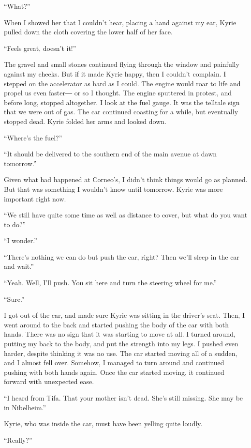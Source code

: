 \documentclass[oneside]{book}
\begin{document}
“What?”

When I showed her that I couldn’t hear, placing a hand against my ear, Kyrie pulled down the cloth covering the lower half of her face.

“Feels great, doesn’t it!”

The gravel and small stones continued flying through the window and painfully against my cheeks. But if it made Kyrie happy, then I couldn’t complain. I stepped on the accelerator as hard as I could. The engine would roar to life and propel us even faster― or so I thought. The engine sputtered in protest, and before long, stopped altogether. I look at the fuel gauge. It was the telltale sign that we were out of gas. The car continued coasting for a while, but eventually stopped dead. Kyrie folded her arms and looked down.

“Where’s the fuel?”

“It should be delivered to the southern end of the main avenue at dawn tomorrow.”

Given what had happened at Corneo’s, I didn’t think things would go as planned. But that was something I wouldn’t know until tomorrow. Kyrie was more important right now.

“We still have quite some time as well as distance to cover, but what do you want to do?”

“I wonder.”

“There’s nothing we can do but push the car, right? Then we’ll sleep in the car and wait.”

“Yeah. Well, I’ll push. You sit here and turn the steering wheel for me.”

“Sure.”

I got out of the car, and made sure Kyrie was sitting in the driver’s seat. Then, I went around to the back and started pushing the body of the car with both hands. There was no sign that it was starting to move at all. I turned around, putting my back to the body, and put the strength into my legs. I pushed even harder, despite thinking it was no use. The car started moving all of a sudden, and I almost fell over. Somehow, I managed to turn around and continued pushing with both hands again. Once the car started moving, it continued forward with unexpected ease.

“I heard from Tifa. That your mother isn’t dead. She’s still missing. She may be in Nibelheim.”

Kyrie, who was inside the car, must have been yelling quite loudly.

“Really?”
\end{document}
